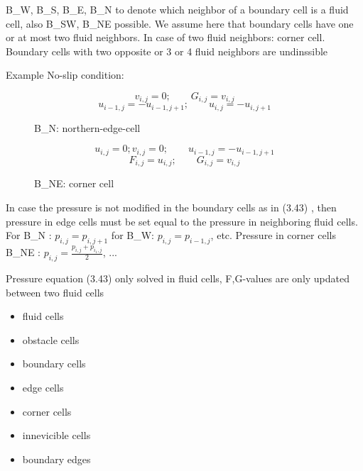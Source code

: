B\_W, B\_S, B\_E, B\_N to denote which neighbor of a boundary cell is a fluid cell, also B\_SW, B\_NE possible. We assume here that boundary cells have one or at most two fluid neighbors. In case of two fluid neighbors: corner cell. Boundary cells with two opposite or 3 or 4 fluid neighbors are undinssible %

Example No-slip condition:
\begin{figure}[H]
	\centering
	\[ v_{i,j} = 0; \qquad G_{i,j} = v_{i,j} \]
	\[ u_{i-1,j} = -u_{i-1,j+1}; \qquad u_{i,j} = - u_{i,j+1} \]
	\renewcommand{\thefigure}{TODO}
	\caption{B\_N: northern-edge-cell}
	\label{fig:disc-freesplipb}
\end{figure}

\begin{figure}[H]
	\centering
	\[ u_{i,j} = 0; v_{i,j} = 0; \qquad u_{i-1,j} = - u_{i-1,j+1} \]
	\[ F_{i,j} = u_{i,j}; \qquad G_{i,j} = v_{i,j} \]
	\renewcommand{\thefigure}{3.53}
	\caption{B\_NE: corner cell}
	\label{fig:disc-freesplipb}
\end{figure}

In case the pressure is not modified in the boundary cells as in (3.43) %
, then pressure in edge cells must be set equal to the pressure in neighboring fluid cells. For B\_N : $p_{i,j} = p_{i,j+1}$ for B\_W: $p_{i,j} = p_{i-1,j}$, etc. Pressure in corner cells B\_NE : $p_{i,j} = \frac{p_{i,j} + p_{i_1,j}}{2}$, ...

Pressure equation (3.43) %
only solved in fluid cells, F,G-values are only updated between two fluid cells
\begin{itemize}
	\item fluid cells
	\item obstacle cells
	\item boundary cells
	\item edge cells
	\item corner cells
	\item innevicible cells
	\item boundary edges
\end{itemize}
